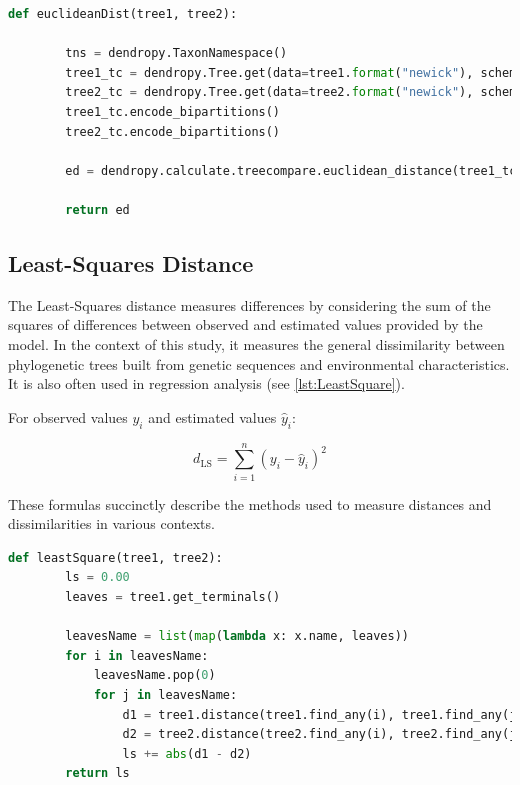 \begin{lstlisting}[label=lst:euclideanDist,language=Python,caption=Python script for calculating the Euclidean distance using the ete3 package in the aPhyloGeo package]
    def euclideanDist(tree1, tree2):
        
        tns = dendropy.TaxonNamespace()
        tree1_tc = dendropy.Tree.get(data=tree1.format("newick"), schema="newick", taxon_namespace=tns)
        tree2_tc = dendropy.Tree.get(data=tree2.format("newick"), schema="newick", taxon_namespace=tns)
        tree1_tc.encode_bipartitions()
        tree2_tc.encode_bipartitions()

        ed = dendropy.calculate.treecompare.euclidean_distance(tree1_tc, tree2_tc)

        return ed
\end{lstlisting}

\subsection{Least-Squares Distance}\label{LS}
The Least-Squares distance measures differences by considering the sum of the squares of differences between observed and estimated values provided by the model. In the context of this study, it measures the general dissimilarity between phylogenetic trees built from genetic sequences and environmental characteristics. It is also often used in regression analysis (see \autoref{lst:LeastSquare}).

For observed values $y_i$ and estimated values $\hat{y}_i$:

\begin{equation}
    d_{\text{LS}} = \sum_{i=1}^{n} (y_i - \hat{y}_i)^2
\end{equation}

These formulas succinctly describe the methods used to measure distances and dissimilarities in various contexts.

\begin{lstlisting}[label=lst:LeastSquare,language=Python,caption=Python script for calculating the Least-Square distance using the ete3 package in the aPhyloGeo package]
    def leastSquare(tree1, tree2):
        ls = 0.00
        leaves = tree1.get_terminals()

        leavesName = list(map(lambda x: x.name, leaves))
        for i in leavesName:
            leavesName.pop(0)
            for j in leavesName:
                d1 = tree1.distance(tree1.find_any(i), tree1.find_any(j))
                d2 = tree2.distance(tree2.find_any(i), tree2.find_any(j))
                ls += abs(d1 - d2)
        return ls
\end{lstlisting}

